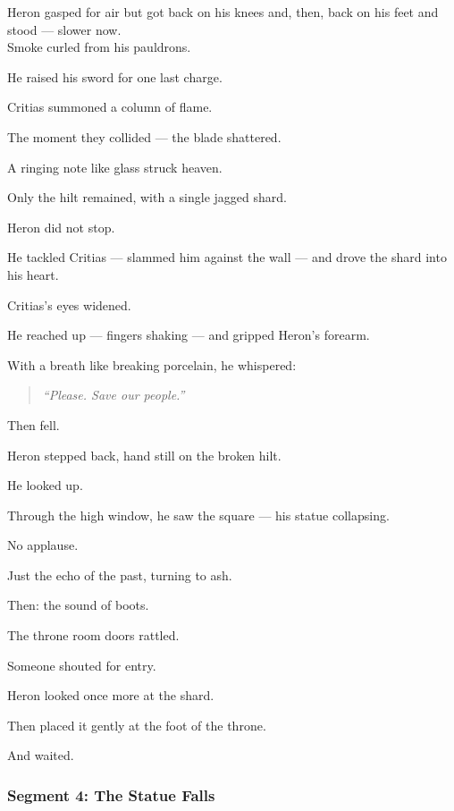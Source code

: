 \documentclass[9pt]{article}
\begin{document}
Heron gasped for air but got back on his knees and, then, back on his feet and stood — slower now.\\
Smoke curled from his pauldrons.

He raised his sword for one last charge.

Critias summoned a column of flame.

The moment they collided — the blade shattered.

A ringing note like glass struck heaven.

Only the hilt remained, with a single jagged shard.

Heron did not stop.

He tackled Critias — slammed him against the wall — and drove the shard into his heart.

\vspace{1em}

Critias’s eyes widened.

He reached up — fingers shaking — and gripped Heron’s forearm.

With a breath like breaking porcelain, he whispered:

\begin{quote}
\textit{“Please. Save our people.”}
\end{quote}

Then fell.

\vspace{1em}

Heron stepped back, hand still on the broken hilt.

He looked up.

Through the high window, he saw the square — his statue collapsing.

No applause.

Just the echo of the past, turning to ash.

Then: the sound of boots.

The throne room doors rattled.

Someone shouted for entry.

Heron looked once more at the shard.

Then placed it gently at the foot of the throne.

And waited.

\newpage

\subsubsection*{Segment 4: The Statue Falls}
\end{document}
